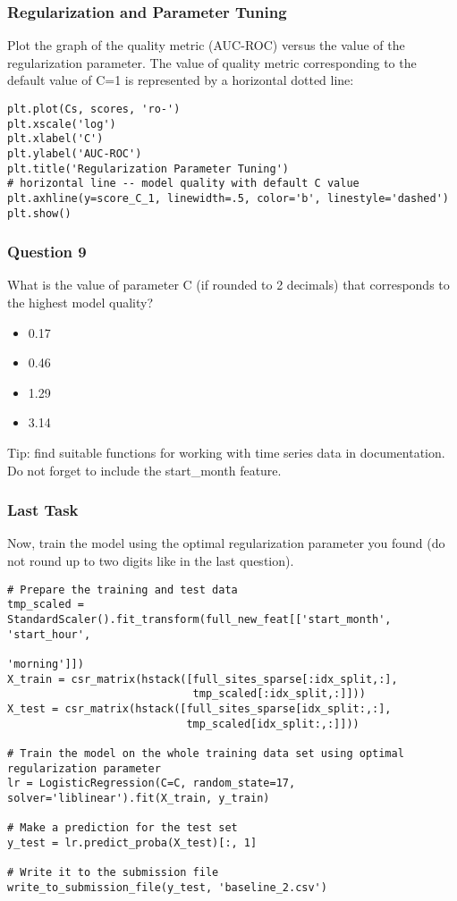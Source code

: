 \begin{frame}[fragile]\frametitle{Regularization and Parameter Tuning}
Plot the graph of the quality metric (AUC-ROC) versus the value of the regularization parameter. The value of quality metric corresponding to the default value of C=1 is represented by a horizontal dotted line:

\begin{lstlisting}
plt.plot(Cs, scores, 'ro-')
plt.xscale('log')
plt.xlabel('C')
plt.ylabel('AUC-ROC')
plt.title('Regularization Parameter Tuning')
# horizontal line -- model quality with default C value
plt.axhline(y=score_C_1, linewidth=.5, color='b', linestyle='dashed') 
plt.show()
\end{lstlisting}
\end{frame}

\begin{frame}[fragile]\frametitle{Question 9}

What is the value of parameter C (if rounded to 2 decimals) that corresponds to the highest model quality?

\begin{itemize}
\item 0.17
\item 0.46
\item 1.29
\item 3.14
\end{itemize}

Tip: find suitable functions for working with time series data in documentation. Do not forget to include the start\_month feature.
\end{frame}

\begin{frame}[fragile]\frametitle{Last Task}
Now, train the model using the optimal regularization parameter you found (do not round up to two digits like in the last question).

\begin{lstlisting}
# Prepare the training and test data
tmp_scaled = StandardScaler().fit_transform(full_new_feat[['start_month', 'start_hour', 
                                                           'morning']])
X_train = csr_matrix(hstack([full_sites_sparse[:idx_split,:], 
                             tmp_scaled[:idx_split,:]]))
X_test = csr_matrix(hstack([full_sites_sparse[idx_split:,:], 
                            tmp_scaled[idx_split:,:]]))

# Train the model on the whole training data set using optimal regularization parameter
lr = LogisticRegression(C=C, random_state=17, solver='liblinear').fit(X_train, y_train)

# Make a prediction for the test set
y_test = lr.predict_proba(X_test)[:, 1]

# Write it to the submission file
write_to_submission_file(y_test, 'baseline_2.csv')
\end{lstlisting}
\end{frame}

